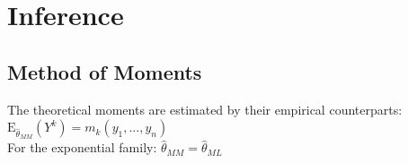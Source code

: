 \documentclass[8pt]{extarticle}
\begin{document}




\section{Inference}


\subsection{Method of Moments}

The theoretical moments are estimated by their empirical counterparts: \ \\
\vspace{0.5em}
$\mathrm{E}_{\hat{\theta}_{MM}}(Y^k) = m_k(y_1,...,y_n)$ \ \\
\vspace{0.5em}
\noindent For the exponential family: $\hat{\theta}_{MM} = \hat{\theta}_{ML}$
\end{document}
